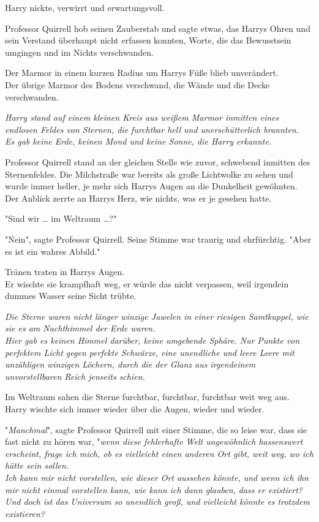{Harry nickte, verwirrt und erwartungsvoll.

Professor Quirrell hob seinen Zauberstab und sagte etwas, das Harrys Ohren und sein Verstand überhaupt nicht erfassen konnten, Worte, die das Bewusstsein umgingen und im Nichts verschwanden.

Der Marmor in einem kurzen Radius um Harrys Füße blieb unverändert.\\ Der übrige Marmor des Bodens verschwand, die Wände und die Decke verschwanden.

\emph{Harry stand auf einem kleinen Kreis aus weißem Marmor inmitten eines endlosen Feldes von Sternen, die furchtbar hell und unerschütterlich brannten.\\ Es gab keine Erde, keinen Mond und keine Sonne, die Harry erkannte.}

Professor Quirrell stand an der gleichen Stelle wie zuvor, schwebend inmitten des Sternenfeldes. Die Milchstraße war bereits als große Lichtwolke zu sehen und wurde immer heller, je mehr sich Harrys Augen an die Dunkelheit gewöhnten.\\ Der Anblick zerrte an Harrys Herz, wie nichts, was er je gesehen hatte.

"Sind wir … im Weltraum …?"

"Nein", sagte Professor Quirrell. Seine Stimme war traurig und ehrfürchtig. "Aber es ist ein wahres Abbild."

Tränen traten in Harrys Augen.\\ Er wischte sie krampfhaft weg, er würde das nicht verpassen, weil irgendein dummes Wasser seine Sicht trübte.

\emph{Die Sterne waren nicht länger winzige Juwelen in einer riesigen Samtkuppel, wie sie es am Nachthimmel der Erde waren.\\ Hier gab es keinen Himmel darüber, keine umgebende Sphäre. Nur Punkte von perfektem Licht gegen perfekte Schwärze, eine unendliche und leere Leere mit unzähligen winzigen Löchern, durch die der Glanz aus irgendeinem unvorstellbaren Reich jenseits schien.}

Im Weltraum sahen die Sterne furchtbar, furchtbar, furchtbar weit weg aus. Harry wischte sich immer wieder über die Augen, wieder und wieder.

"\emph{Manchmal}", sagte Professor Quirrell mit einer Stimme, die so leise war, dass sie fast nicht zu hören war, "\emph{wenn diese fehlerhafte Welt ungewöhnlich hassenswert erscheint, frage ich mich, ob es vielleicht einen anderen Ort gibt, weit weg, wo ich} \emph{hätte sein sollen.\\ Ich kann mir nicht vorstellen, wie dieser Ort aussehen könnte, und wenn ich ihn mir nicht einmal vorstellen kann, wie kann ich dann glauben, dass er existiert? Und doch ist das Universum so unendlich groß, und vielleicht könnte es trotzdem existieren?}

}
